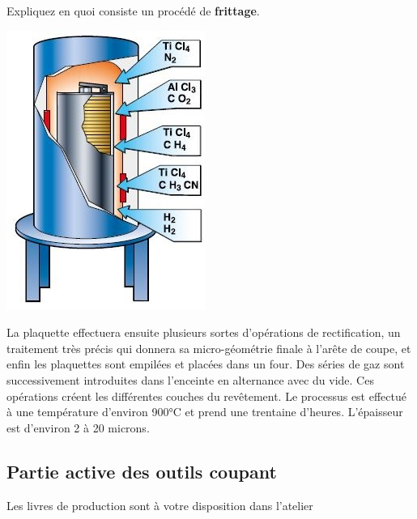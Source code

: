 \documentclass[12pt]{article}
\newcounter{exo}
\newenvironment{exo}{\stepcounter{exo}\vspace{0.5cm}{\bfseries Question \theexo\ :}}{\par\vspace{0.5cm}}
\begin{document}
\begin{exo} Expliquez en quoi consiste un procédé de \textbf{frittage}.\end{exo}


\begin{minipage}{.55\linewidth}
\includegraphics[width=0.7\linewidth]{Images/PLA15.JPG}
\end{minipage}
\begin{minipage}{.44\linewidth}
La plaquette effectuera ensuite plusieurs sortes d'opérations de rectification, un traitement très précis qui donnera sa micro-géométrie finale à l'arête de coupe, et enfin les plaquettes sont empilées et placées dans un four. Des séries de gaz sont successivement introduites dans l'enceinte en alternance avec du vide. Ces opérations créent les différentes couches du revêtement. Le processus est effectué à une température d'environ 900°C et prend une trentaine d'heures. L'épaisseur est d'environ 2 à 20 microns.
\end{minipage}


\subsection{Partie active des outils coupant}

\begin{tcolorbox}[colback=blue!5!white,colframe=red!75!black]
  \bcinfo Les livres de production sont à votre disposition dans l'atelier
\end{tcolorbox}
\end{document}
